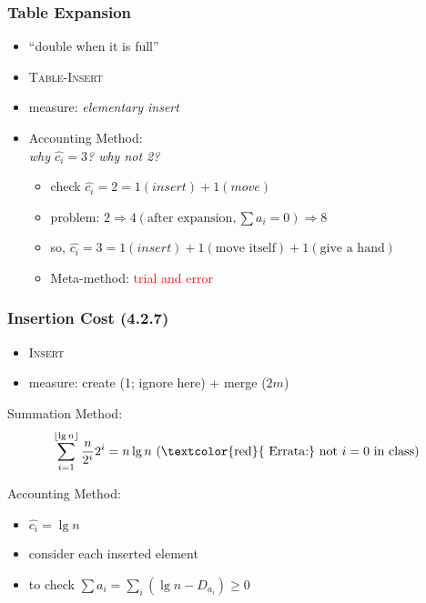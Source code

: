 \documentclass{beamer}
\DeclarePairedDelimiter\floor{\lfloor}{\rfloor}
\begin{document}
\begin{frame}
  \frametitle{Table Expansion}
  
  \begin{example}
    \begin{itemize}
      \item ``double when it is full''
      \item \textsc{Table-Insert}
      \item measure: \emph{elementary insert}
    \end{itemize}
    \begin{itemize}
      \item Accounting Method: \\
        \emph{why $\hat{c_i} = 3$? why not 2?}
        \begin{itemize}
          \setlength{\itemsep}{3pt}
          \item check $\hat{c_i} = 2 = 1 (insert) + 1 (move)$
		  \item problem: $2 \Rightarrow 4 (\textrm{after expansion}, \sum a_i = 0)
		  \Rightarrow 8$
		  \item so, $\hat{c_i} = 3 = 1 (insert) + 1 (\textrm{move itself}) + 1
		  (\textrm{give a hand})$
		  \item Meta-method: \textcolor{red}{trial and error} 
        \end{itemize}
    \end{itemize}
  \end{example}
\end{frame}

\begin{frame}
  \frametitle{Insertion Cost (4.2.7)}
  
  \begin{example}
    \begin{itemize}
      \item \textsc{Insert}
      \item measure: create (1; ignore here) + merge ($2m$)
    \end{itemize}
    Summation Method: \[ \sum_{i=1}^{\floor{\lg n}} \frac{n}{2^i} 2^i = n \lg
    n \textrm{ (\textcolor{red}{  Errata:} not $i=0$ in class)}
    \]
    
    Accounting Method: 
      \begin{itemize}
        \item $\hat{c_i} = \lg n$
        \item consider each inserted element
        \item to check $\sum a_i = \sum_{i} (\lg n - D_{a_i}) \geq 0$
      \end{itemize}
  \end{example}
\end{frame}
\end{document}
